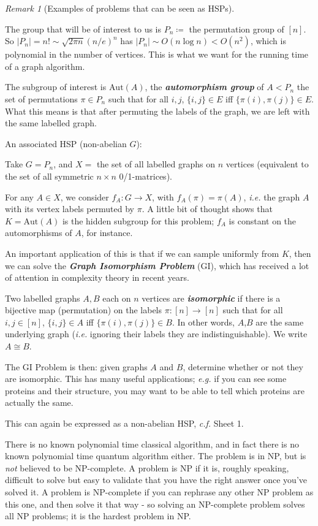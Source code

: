 \documentclass[]{article}
\theoremstyle{custhm}
\theoremstyle{cusdef}
\theoremstyle{custhm}
\theoremstyle{custhm}
\theoremstyle{custhm}
\theoremstyle{custhm}
\theoremstyle{cusdef}
\theoremstyle{remark}
\newtheorem*{remark*}{Remark}
\newcommand{\ra}{\rightarrow}
\newcommand{\undf}[1]{\textit{\textbf{#1}}}
\renewcommand{\it}[1]{\textit{#1}}
\begin{document}
\begin{remark*}[Examples of problems that can be seen as HSPs]
\begin{enumerate}[label = (\alph*)]
	The group that will be of interest to us is $P_n \coloneqq$ the permutation group of $[n]$. So $|P_n| = n! \sim \sqrt{2\pi n}(n/e)^n$ has $|P_n|\sim O(n\log n) < O(n^2)$, which is polynomial in the number of vertices. This is what we want for the running time of a graph algorithm.
	
	The subgroup of interest is $\textrm{Aut}(A)$, the \undf{automorphism group} of $A < P_n$ the set of permutations $\pi \in P_n$ such that for all $i,j$, $\{i,j\}\in E$ iff $\{\pi(i),\pi(j)\}\in E$. What this means is that after permuting the labels of the graph, we are left with the same labelled graph.
	
	An associated HSP (non-abelian $G$):
	
	Take $G = P_n$, and $X = $ the set of all labelled graphs on $n$ vertices (equivalent to the set of all symmetric $n\times n$ 0/1-matrices).
	
	For any $A\in X$, we consider $f_A : G\ra X$, with $f_A(\pi) = \pi(A)$, \it{i.e.} the graph $A$ with its vertex labels permuted by $\pi$. A little bit of thought shows that $K = \textrm{Aut}(A)$ is the hidden subgroup for this problem; $f_A$ is constant on the automorphisms of $A$, for instance.
	
	An important application of this is that if we can sample uniformly from $K$, then we can solve the \undf{Graph Isomorphism Problem} (GI), which has received a lot of attention in complexity theory in recent years.
	
	Two labelled graphs $A,B$ each on $n$ vertices are \undf{isomorphic} if there is a bijective map (permutation) on the labels $\pi :[n]\ra[n]$ such that for all $i,j\in [n]$, $\{i,j\}\in A$ iff $\{\pi(i),\pi(j)\}\in B$. In other words, $A$,$B$ are the same underlying graph (\it{i.e.} ignoring their labels they are indistinguishable). We write $A\cong B$.
	
	The GI Problem is then: given graphs $A$ and $B$, determine whether or not they are isomorphic. This has many useful applications; \it{e.g.} if you can see some proteins and their structure, you may want to be able to tell which proteins are actually the same.
	
	This can again be expressed as a non-abelian HSP, \it{c.f.} Sheet 1.
	
	There is no known polynomial time classical algorithm, and in fact there is no known polynomial time quantum algorithm either. The problem is in NP, but is \it{not} believed to be NP-complete. A problem is NP if it is, roughly speaking, difficult to solve but easy to validate that you have the right answer once you've solved it. A problem is NP-complete if you can rephrase any other NP problem as this one, and then solve it that way - so solving an NP-complete problem solves all NP problems; it is the hardest problem in NP.
	

\end{enumerate}
\end{remark*}
\end{document}
